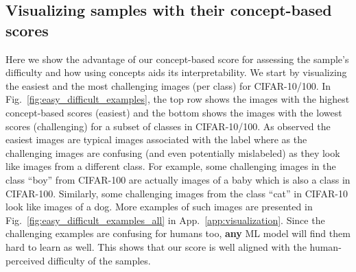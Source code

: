 



\subsection{Visualizing samples with their concept-based scores}
\label{sec:visualization}
Here we show the advantage of our concept-based score for assessing the sample's difficulty and how using concepts aids its interpretability. %
We start by visualizing the easiest and the most challenging images (per class) for CIFAR-10/100.
In Fig.~\ref{fig:easy_difficult_examples}, the top row shows the images with the highest concept-based scores (easiest) and the bottom shows the images with the lowest scores (challenging) for a subset of classes in CIFAR-10/100. 
As observed the easiest images are typical images associated with the label where as the challenging images are confusing (and even potentially mislabeled) as they look like images from a different class. %
For example, some challenging images in the class ``boy'' from CIFAR-100 are actually images of a baby which is also a class in CIFAR-100. 
Similarly, some challenging images from the class ``cat'' in CIFAR-10 look like images of a dog. 
More examples of such images are presented in Fig.~\ref{fig:easy_difficult_examples_all} in App.~\ref{app:visualization}.
Since the challenging examples are confusing for humans too, {\bf any} ML model will find them hard to learn as well. 
This shows that our score is well aligned with the human-perceived difficulty of the samples. %
 
